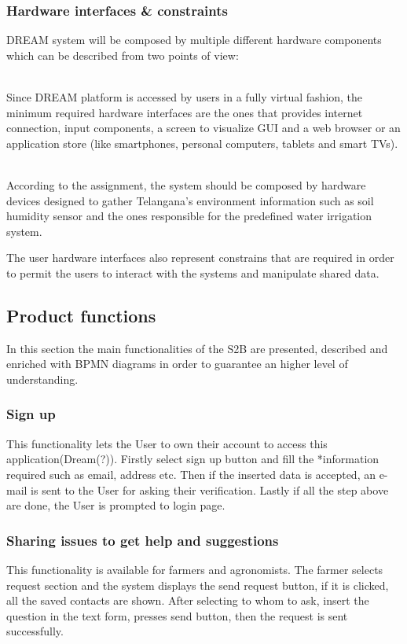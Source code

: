 \subsubsection{Hardware interfaces \& constraints}
DREAM system will be composed by multiple different hardware components which can be described from two points of view:
\begin{description}[font=~\normalfont\scshape]
    \item[\textbf{\textcolor{myblue}{user perspective}}] \hfill \\Since DREAM platform is accessed by users in a fully virtual fashion, the minimum required hardware interfaces are the ones that provides internet connection, input components, a screen to visualize GUI and a web browser or an application store (like smartphones, personal computers, tablets and smart TVs).
    \item[\textbf{\textcolor{myblue}{system perspective}}] \hfill \\According to the assignment, the system should be composed by hardware devices designed to gather Telangana's environment information such as soil humidity sensor and the ones responsible for the predefined water irrigation system.
\end{description}
The user hardware interfaces also represent constrains that are required in order to permit the users to interact with the systems and manipulate shared data.

\subsection{Product functions}
\label{sect:product_functions}
In this section the main functionalities of the S2B are presented, described and enriched with BPMN diagrams in order to guarantee an higher level of understanding.
\subsubsection{Sign up}
This functionality lets the User to own their account to access this application(Dream(?)).
Firstly select sign up button and fill the *information required such as email, address etc.
Then if the inserted data is accepted, an e-mail is sent to the User for asking their
verification.
Lastly if all the step above are done, the User is prompted to login page.
\subsubsection{Sharing issues to get help and suggestions}
This functionality is available for farmers and agronomists. The farmer selects request 
section and the system displays the send request button, if it is clicked, all the saved 
contacts are shown. After selecting to whom to ask, insert the question in the text form,
presses send button, then the request is sent successfully.

